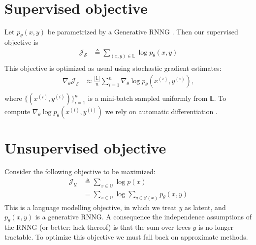 \documentclass[examplefnt,biber]{nowfnt} %
\begin{document}
\section{Supervised objective}
Let $p_{\theta}(x,y)$ be parametrized by a Generative RNNG \citep{Dyer+2016:RNNG}. Then our supervised objective is
\begin{align}
    \mathcal{J}_{\mathcal{S}}
        &\triangleq \sum_{(x,y) \in \mathbb{L}} \log p_{\theta} (x, y) \\
\end{align}
This objective is optimized as usual using stochastic gradient estimates:
\begin{align}
    \nabla_{\theta} \mathcal{J}_{\mathcal{S}}
        &\approx \frac{|\mathbb{L}|}{n} \sum_{i=1}^n \nabla_{\theta} \log p_{\theta} (x^{(i)}, y^{(i)}), \\
\end{align}
where $\{(x^{(i)}, y^{(i)})\}_{i=1}^n$ is a mini-batch sampled uniformly from $\mathbb{L}$. To compute $\nabla_{\theta} \log p_{\theta}(x^{(i)}, y^{(i)})$ we rely on automatic differentiation \citep{Baydin+2015:AD}.

\section{Unsupervised objective}
Consider the following objective to be maximized:
\begin{subequations}
\begin{align}
    \mathcal{J}_{\mathcal{U}}
        &\triangleq \sum_{x \in \mathbb{U}} \log p (x) \\
        &= \sum_{x \in \mathbb{U}} \log \sum_{y \in \mathcal{Y}(x)} p_{\theta}(x, y)
\end{align}
\end{subequations}
This is a language modelling objective, in which we treat $y$ as latent, and $p_{\theta}(x,y)$ is a generative RNNG. A consequence the independence assumptions of the RNNG (or better: lack thereof) is that the sum over trees $y$ is no longer tractable.  To optimize this objective we must fall back on approximate methods.
\end{document}
